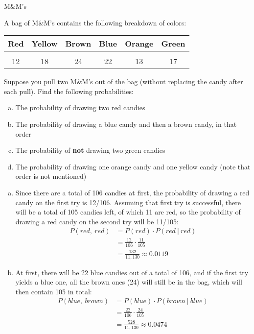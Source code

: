 \begin{example}[https://www.youtube.com/watch?v=j8BFTGwza9s&list=PLfmpjsIzhzts14-9s5QixRje97EI2oeMF&index=24]{M\&M's}

A bag of M\&M's contains the following breakdown of colors:

\begin{center}
\begin{tabular}{c c c c c c}
\textbf{Red} & \textbf{Yellow} &  \textbf{Brown} & \textbf{Blue} & \textbf{Orange} & \textbf{Green} \\ \hline
& & & & & \\
12 & 18 & 24 &  22 &  13 & 17 \\
\end{tabular}
\end{center}
Suppose you pull two M\&M's out of the bag (without replacing the candy after each pull). Find the following probabilities:
\begin{enumerate}[(a)]
\item The probability of drawing two red candies
\item The probability of drawing a blue candy and then a brown candy, in that order
\item The probability of \textbf{not} drawing two green candies
\item The probability of drawing one orange candy and one yellow candy (note that order is not mentioned)
\end{enumerate}
\pagebreak

\sol
\begin{enumerate}[(a)]
\item Since there are a total of 106 candies at first, the probability of drawing a red candy on the first try is 12/106.  Assuming that first try is successful, there will be a total of 105 candies left, of which 11 are red, so the probability of drawing a red candy on the second try will be 11/105:
\begin{align*}
P(red,\ red) &= P(red) \cdot P(red\ |\ red)\\
&= \frac{12}{106} \cdot \frac{11}{105}\\
&= \boxed{\frac{132}{11,130} \approx 0.0119}
\end{align*}

\item At first, there will be 22 blue candies out of a total of 106, and if the first try yields a blue one, all the brown ones (24) will still be in the bag, which will then contain 105 in total:
\begin{align*}
P(blue,\ brown) &= P(blue) \cdot P(brown \ | \ blue)\\
&= \frac{22}{106} \cdot \frac{24}{105}\\
&= \boxed{\frac{528}{11,130} \approx 0.0474}
\end{align*}


\end{enumerate}
\end{example}
